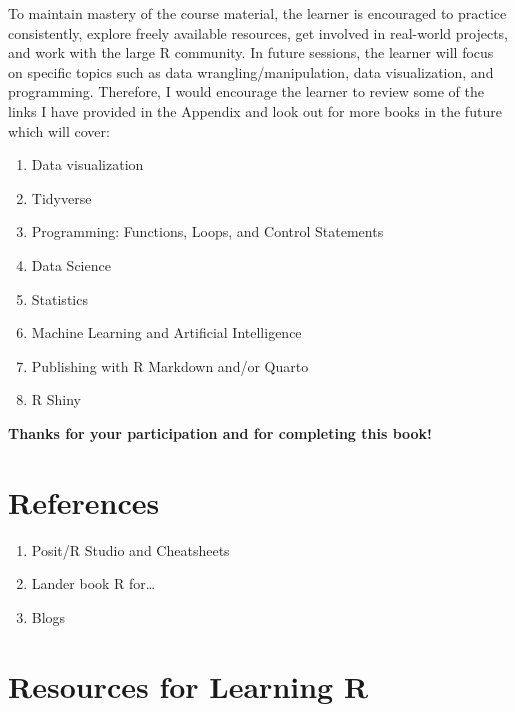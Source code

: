 \documentclass[
  letterpaper,
  DIV=11,
  numbers=noendperiod]{scrreprt}
\providecommand{\tightlist}{%
  \setlength{\itemsep}{0pt}\setlength{\parskip}{0pt}}\usepackage{longtable,booktabs,array}
\newlength{\cslhangindent}
\newenvironment{CSLReferences}[2] %
 {\begin{list}{}{%
  \setlength{\itemindent}{0pt}
  \setlength{\leftmargin}{0pt}
  \setlength{\parsep}{0pt}
  \ifodd #1
   \setlength{\leftmargin}{\cslhangindent}
   \setlength{\itemindent}{-1\cslhangindent}
  \fi
  \setlength{\itemsep}{#2\baselineskip}}}
 {\end{list}}
\begin{document}
To maintain mastery of the course material, the learner is encouraged to
practice consistently, explore freely available resources, get involved
in real-world projects, and work with the large R community. In future
sessions, the learner will focus on specific topics such as data
wrangling/manipulation, data visualization, and programming. Therefore,
I would encourage the learner to review some of the links I have
provided in the Appendix and look out for more books in the future which
will cover:

\begin{enumerate}
\def\labelenumi{\roman{enumi}.}
\item
  Data visualization
\item
  Tidyverse
\item
  Programming: Functions, Loops, and Control Statements
\item
  Data Science
\item
  Statistics
\item
  Machine Learning and Artificial Intelligence
\item
  Publishing with R Markdown and/or Quarto
\item
  R Shiny
\end{enumerate}

\textbf{Thanks for your participation and for completing this book!}


\chapter*{References}\label{references}


\label{refs}
\begin{CSLReferences}{0}{1}
\begin{enumerate}
\def\labelenumi{\arabic{enumi}.}
\tightlist
\item
  Posit/R Studio and Cheatsheets
\item
  Lander book R for\ldots{}
\item
  Blogs
\end{enumerate}

\end{CSLReferences}

\cleardoublepage
{}
{}
\appendix

\chapter{Resources for Learning R}\label{sec-appendix-1}
\end{document}

